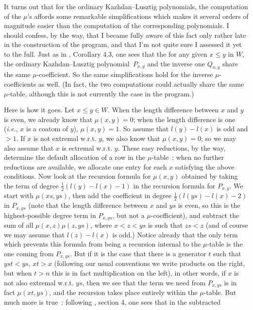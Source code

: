 \documentclass[11pt]{article}
\newcommand{\ds}{\displaystyle}
\newcommand{\klpol}{Kazh\-dan--Lusz\-tig po\-ly\-no\-mial}
\begin{document}
It turns out that for the ordinary \klpol s, the computation of the $\mu$'s
affords some remarkable simplifications which makes it several orders of 
magnitude easier than the computation of the corresponding polynomials. I
should confess, by the way, that I became fully aware of this fact only
rather late in the construction of the program, and that I'm not quite sure
I assessed it yet to the full. Just as in \cite{kl:1979}, Corollary 4.3,
one sees that the for any given $x\leq y$ in $W$, the ordinary \klpol\ 
$P_{x,y}$ and the inverse one $Q_{x,y}$ share the same $\mu$-coefficient.
So the same simplifications hold for the inverse $\mu$-coefficients as well.
(In fact, the two computations could actually share the same $\mu$-table,
although this is not currently the case in the program.)

Here is how it goes. Let $x\leq y\in W$. When the length difference between
$x$ and $y$ is even, we already know that $\mu(x,y)=0$; when the length 
difference is one ({\em i.e.}, $x$ is a coatom of $y$), $\mu(x,y)=1$. So
assume that $l(y)-l(x)$ is odd and $>1$. If $x$ is not extremal w.r.t. $y$,
we also know that $\mu(x,y)=0$; so we may also assume that $x$ is ectremal
w.r.t. $y$. These easy reductions, by the way, determine the default
allocation of a row in the $\mu$-table~: when no further reductions are 
available, we allocate one entry for each $x$ satisfying the above conditions.
Now look at the recursion formula for $\mu(x,y)$ obtained by taking the term
of degree $\ds{\frac{1}{2}(l(y)-l(x)-1)}$ in the recursion formula for 
$P_{x,y}$. We start with $\mu(xs,ys)$, then add the coefficient in degree
$\ds{\frac{1}{2}(l(ys)-l(x)-2)}$ in $P_{x,ys}$ (note that the length difference
between $x$ and $ys$ is even, so this is the highest-possible degree term in
$P_{x,ys}$, but not a $\mu$-coefficient), and subtract the sum of all
$\mu(x,z)\mu(z,ys)$, where $x<z<ys$ is such that $zs<z$ (and of course we
may assume that $l(z)-l(x)$ is odd.) Notice already that the only term which
prevents this formula from being a recursion internal to the $\mu$-table is
the one coming from $P_{x,ys}$. But if it is the case that there is a generator
$t$ such that $yst<ys$, $xt>x$ (following our usual conventions we write
products on the right, but when $t>n$ this is in fact multiplication on the
left), in other words, if $x$ is not also extremal w.r.t. $ys$, then we see
that the term we need from $P_{x,ys}$ is in fact $\mu(xt,ys)$, and
the recursion takes place entirely within the $\mu$-table. But much more is
true~: following \cite{kl:1979}, section 4, one sees that in the subtracted
\end{document}
